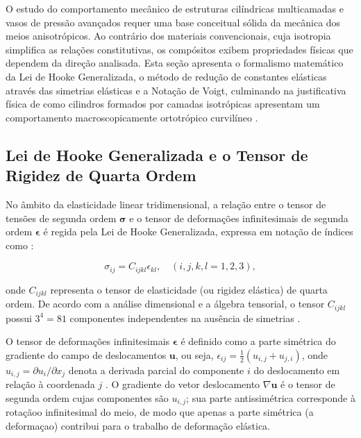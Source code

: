 O estudo do comportamento mecânico de estruturas cilíndricas multicamadas e vasos de pressão avançados requer uma base conceitual sólida da mecânica dos meios anisotrópicos. Ao contrário dos materiais convencionais, cuja isotropia simplifica as relações constitutivas, os compósitos exibem propriedades físicas que dependem da direção analisada. Esta seção apresenta o formalismo matemático da Lei de Hooke Generalizada, o método de redução de constantes elásticas através das simetrias elásticas e a Notação de Voigt, culminando na justificativa física de como cilindros formados por camadas isotrópicas apresentam um comportamento macroscopicamente ortotrópico curvilíneo \cite{RMJones2018}.

\subsection{Lei de Hooke Generalizada e o Tensor de Rigidez de Quarta Ordem}

No âmbito da elasticidade linear tridimensional, a relação entre o tensor de tensões de segunda ordem $\mathbf{\sigma}$ e o tensor de deformações infinitesimais de segunda ordem $\mathbf{\epsilon}$ é regida pela Lei de Hooke Generalizada, expressa em notação de índices como \cite{lai2010continuum}:

\begin{equation} 
    \sigma_{ij} = C_{ijkl} \epsilon_{kl} , \quad (i, j, k, l = 1, 2, 3),
\end{equation}\label{eq:hooketensor}

onde $C_{ijkl}$ representa o tensor de elasticidade (ou rigidez elástica) de quarta ordem. De acordo com a análise dimensional e a álgebra tensorial, o tensor $C_{i j k l}$ possui $3^4 = 81$ componentes independentes na ausência de simetrias \cite{lai2010continuum}.

O tensor de deformações infinitesimais $\mathbf{\epsilon}$ é definido como a parte simétrica do gradiente do campo de deslocamentos $\mathbf{u}$, ou seja, $\epsilon_{ij} = \frac{1}{2}(u_{i,j} + u_{j,i})$, onde $u_{i,j} = \partial u_i / \partial x_j$ denota a derivada parcial do componente $i$ do deslocamento em relação à coordenada $j$ \cite{lai2010continuum, Sadd2009}. O gradiente do vetor deslocamento $\nabla \mathbf{u}$ é o tensor de segunda ordem cujas componentes são $u_{i,j}$; sua parte antissimétrica corresponde à rotaçãoo infinitesimal do meio, de modo que apenas a parte simétrica (a deformaçao) contribui para o trabalho de deformação elástica.

